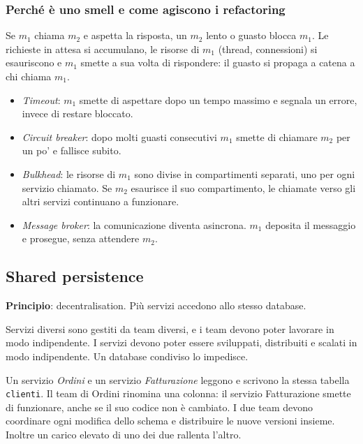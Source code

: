 \subsubsection{Perché è uno smell e come agiscono i refactoring\aggiunta}
Se $m_1$ chiama $m_2$ e aspetta la risposta, un $m_2$ lento o guasto blocca $m_1$. Le richieste in attesa si
accumulano, le risorse di $m_1$ (thread, connessioni) si esauriscono e $m_1$ smette a sua volta di rispondere: il
guasto si propaga a catena a chi chiama $m_1$.
\begin{itemize}
  \item \emph{Timeout}: $m_1$ smette di aspettare dopo un tempo massimo e segnala un errore, invece di restare bloccato.
  \item \emph{Circuit breaker}: dopo molti guasti consecutivi $m_1$ smette di chiamare $m_2$ per un po' e fallisce subito.
  \item \emph{Bulkhead}: le risorse di $m_1$ sono divise in compartimenti separati, uno per ogni servizio chiamato. Se
    $m_2$ esaurisce il suo compartimento, le chiamate verso gli altri servizi continuano a funzionare.
  \item \emph{Message broker}: la comunicazione diventa asincrona. $m_1$ deposita il messaggio e prosegue, senza
    attendere $m_2$.
\end{itemize}

\subsection{Shared persistence}

\textbf{Principio}: decentralisation. Più servizi accedono allo stesso database.

\begin{attenzione}
Servizi diversi sono gestiti da team diversi, e i team devono poter lavorare in modo indipendente. I servizi devono
poter essere sviluppati, distribuiti e scalati in modo indipendente. Un database condiviso lo impedisce.
\end{attenzione}

\begin{esempio}
Un servizio \emph{Ordini} e un servizio \emph{Fatturazione} leggono e scrivono la stessa tabella \texttt{clienti}. Il
team di Ordini rinomina una colonna: il servizio Fatturazione smette di funzionare, anche se il suo codice non è
cambiato. I due team devono coordinare ogni modifica dello schema e distribuire le nuove versioni insieme. Inoltre
un carico elevato di uno dei due rallenta l'altro.
\end{esempio}

